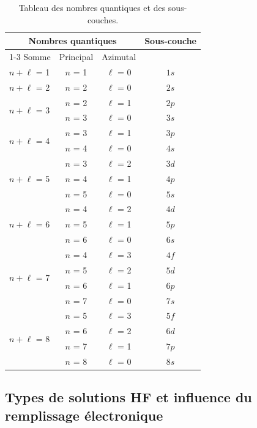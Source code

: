 \documentclass[12pt,a4paper]{article} %
\numberwithin{equation}{section} %
\numberwithin{figure}{section} %
\numberwithin{table}{section} %
\begin{document}
\begin{table}[h]
\centering
\begin{tabular}{|l|c|c|c|}
\hline
\multicolumn{3}{|c|}{Nombres quantiques} & \multirow[c]{2}{1in}{Sous-couche} \\
\cline{1-3}
Somme & Principal & Azimutal & \\
\hline
$n + \ell$ = 1 & $n$ = 1 & $\ell$ = 0 & $1s$ \\
\hline
$n + \ell$ = 2 & $n$ = 2 & $\ell$ = 0 & $2s$ \\
\hline
\multirow[c]{2}{1in}{$n + \ell$ = 3} & $n$ = 2 & $\ell$ = 1 & $2p$ \\
 & $n$ = 3 & $\ell$ = 0 & $3s$ \\
\hline
\multirow[c]{2}{1in}{$n + \ell$ = 4} & $n$ = 3 & $\ell$ = 1 & $3p$ \\
 & $n$ = 4 & $\ell$ = 0 & $4s$ \\
\hline
\multirow[c]{3}{1in}{$n + \ell$ = 5} & $n$ = 3 & $\ell$ = 2 & $3d$ \\
 & $n$ = 4 & $\ell$ = 1 & $4p$ \\
 & $n$ = 5 & $\ell$ = 0 & $5s$ \\
\hline
\multirow[c]{3}{1in}{$n + \ell$ = 6} & $n$ = 4 & $\ell$ = 2 & $4d$ \\
 & $n$ = 5 & $\ell$ = 1 & $5p$ \\
 & $n$ = 6 & $\ell$ = 0 & $6s$ \\
\hline
\multirow[c]{4}{1in}{$n + \ell$ = 7} & $n$ = 4 & $\ell$ = 3 & $4f$ \\
 & $n$ = 5 & $\ell$ = 2 & $5d$ \\
 & $n$ = 6 & $\ell$ = 1 & $6p$ \\
 & $n$ = 7 & $\ell$ = 0 & $7s$ \\
\hline
\multirow[c]{4}{1in}{$n + \ell$ = 8} & $n$ = 5 & $\ell$ = 3 & $5f$ \\
 & $n$ = 6 & $\ell$ = 2 & $6d$ \\
 & $n$ = 7 & $\ell$ = 1 & $7p$ \\
 & $n$ = 8 & $\ell$ = 0 & $8s$ \\
\hline
\end{tabular}
\caption{Tableau des nombres quantiques et des sous-couches.}
\label{tab:nombresQuantiques}
\end{table}


\subsection{Types de solutions HF et influence du remplissage électronique}
\end{document}
